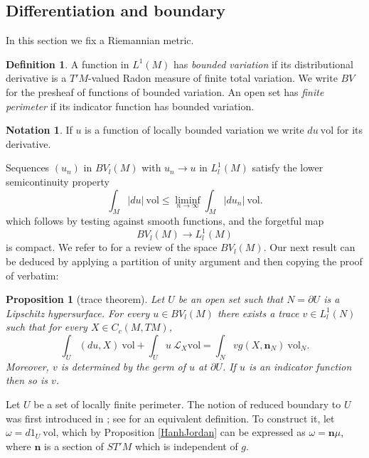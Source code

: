 \documentclass[reqno,12pt,letterpaper]{amsart}
\newcommand{\normal}{\mathbf n}
\newcommand{\vol}{\mathrm{vol}}
\newcommand{\dfn}[1]{\emph{#1}\index{#1}}
\newtheorem{proposition}[theorem]{Proposition}
\theoremstyle{definition}
\newtheorem{definition}[theorem]{Definition}
\newtheorem{notation}[theorem]{Notation}
\numberwithin{equation}{section}
\begin{document}
\subsection{Differentiation and boundary}
In this section we fix a Riemannian metric.

\begin{definition}
A function in $L^1(M)$ has \dfn{bounded variation} if its distributional derivative is a $T'M$-valued Radon measure of finite total variation.
We write $BV$ for the presheaf of functions of bounded variation.
An open set has \dfn{finite perimeter} if its indicator function has bounded variation.
\end{definition}

\begin{notation}
If $u$ is a function of locally bounded variation we write $du ~\vol$ for its derivative.
\end{notation}

Sequences $(u_n)$ in $BV_l(M)$ with $u_n \to u$ in $L^1_l(M)$ satisfy the lower semicontinuity property
\begin{equation}
\label{RieszMarkovDistr}
\int_M |du| ~\vol \leq \liminf_{n \to \infty} \int_M |du_n| ~\vol.
\end{equation}
which follows by testing against smooth functions, and the forgetful map
\begin{equation}\label{Forget}
BV_l(M) \to L^1_l(M)
\end{equation}
is compact. We refer to \cite[Chapter 1]{Giusti77} for a review of the space $BV_l(M)$.
Our next result can be deduced by applying a partition of unity argument and then copying the proof of \cite[Teorema 1]{Miranda67} verbatim:

\begin{proposition}[trace theorem]\label{traces}
Let $U$ be an open set such that $N = \partial U$ is a Lipschitz hypersurface.
For every $u \in BV_l(M)$ there exists a trace $v \in L^1_l(N)$ such that for every $X \in C_c(M, TM)$,
\begin{equation}\label{Miranda IBP}
\int_U (du, X) ~\vol + \int_U u ~\mathcal L_X\vol = \int_N vg(X, \normal_N) ~\vol_N.
\end{equation}
Moreover, $v$ is determined by the germ of $u$ at $\partial U$.
If $u$ is an indicator function then so is $v$.
\end{proposition}

Let $U$ be a set of locally finite perimeter.
The notion of reduced boundary to $U$ was first introduced in \cite{deGiorgi55}; see \cite{Battista_2021} for an equivalent definition.
To construct it, let $\omega = d1_U ~\vol$, which by Proposition \ref{HanhJordan} can be expressed as $\omega = \normal \mu$, where $\normal$ is a section of $ST'M$ which is independent of $g$.
\end{document}
